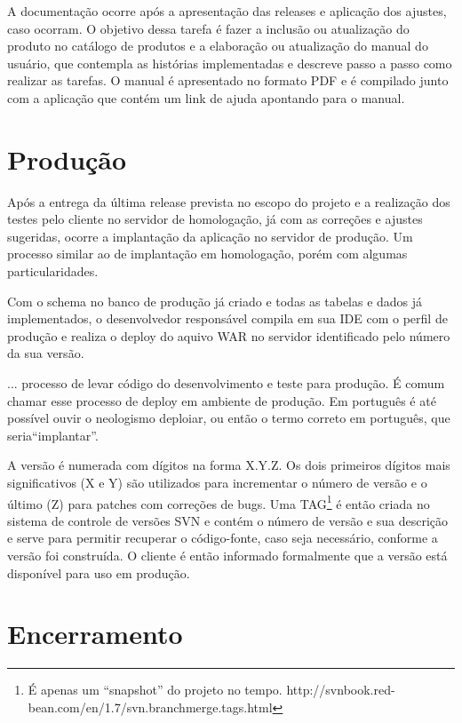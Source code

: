 A documentação ocorre após a apresentação das releases e aplicação dos ajustes, caso ocorram. O objetivo dessa tarefa é fazer a inclusão ou atualização do produto no catálogo de  produtos e a elaboração ou atualização do manual do usuário, que contempla as histórias implementadas e descreve passo a passo como realizar as tarefas. O manual é apresentado no formato PDF e é compilado junto com a aplicação que contém um link de ajuda apontando para o manual.


\section{Produção}
\label{sec:atividadesRealizadasProdução}

Após a entrega da última release prevista no escopo do projeto e a realização dos testes pelo cliente no servidor de homologação, já com as correções e ajustes sugeridas, ocorre a implantação da aplicação no servidor de produção. Um processo similar ao de implantação em homologação, porém com algumas particularidades.

Com o schema no banco de produção já criado e todas as tabelas e dados já implementados, o desenvolvedor responsável compila em sua IDE com o perfil de produção e realiza o deploy do aquivo WAR no servidor identificado pelo número da sua versão.

\begin{citacao}
... processo de levar código do desenvolvimento e teste para produção. É comum chamar esse processo de deploy em ambiente de
produção. Em português é até possível ouvir o neologismo deploiar, ou então o termo correto em português, que seria“implantar”. \cite[p.~19]{Sato2014}
\end{citacao}

A versão é numerada com dígitos na forma X.Y.Z. Os dois primeiros dígitos mais significativos (X e Y) são utilizados para incrementar o número de versão e o último (Z) para patches com correções de bugs. Uma  TAG\footnote{ É apenas um “snapshot” do projeto no tempo. http://svnbook.red-bean.com/en/1.7/svn.branchmerge.tags.html} é então criada no sistema de controle de versões SVN e contém o número de versão e sua descrição e serve para permitir recuperar o código-fonte, caso seja necessário, conforme a versão foi construída. O cliente é então informado formalmente que a versão está disponível para uso em produção.

\section{Encerramento}
\label{sec:atividadesRealizadasEncerramento}

